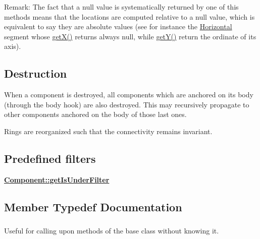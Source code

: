 \begin{DoxyParagraph}{Remark\-:}
The fact that a null value is systematically returned by one of this methods means that the locations are computed relative to a null value, which is equivalent to say they are absolute values (see for instance the \hyperlink{classHurricane_1_1Horizontal}{Horizontal} segment whose \hyperlink{classHurricane_1_1Component_a0f8299ed73705fd4fbf56589dcc7e074}{get\-X()} returns always null, while \hyperlink{classHurricane_1_1Component_a727da3f127c3a7a0a09468219f98c3e6}{get\-Y()} return the ordinate of its axis).
\end{DoxyParagraph}
\hypertarget{classHurricane_1_1Component_secComponentDestruction}{}\subsection{Destruction}\label{classHurricane_1_1Component_secComponentDestruction}
When a component is destroyed, all components which are anchored on its body (through the body hook) are also destroyed. This may recursively propagate to other components anchored on the body of those last ones.

Rings are reorganized such that the connectivity remains invariant.\hypertarget{classHurricane_1_1Component_secComponentPredefinedFilters}{}\subsection{Predefined filters}\label{classHurricane_1_1Component_secComponentPredefinedFilters}
{\bfseries \hyperlink{classHurricane_1_1Component_a8680f2756892366db8642bfcfd7ce097}{Component\-::get\-Is\-Under\-Filter}} 

\subsection{Member Typedef Documentation}
\hypertarget{classHurricane_1_1Component_a3911e94f9d220eb809d349b1181034e3}{
\subsubsection[{Inherit}]{}}\label{classHurricane_1_1Component_a3911e94f9d220eb809d349b1181034e3}
Useful for calling upon methods of the base class without knowing it. 

